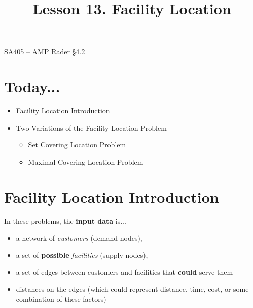 \documentclass[11pt]{article}
\makeatletter
\renewcommand{\labelitemi}{$\bullet$}
\theoremstyle{definition}
\renewcommand{\maketitle}{
  \noindent SA405 -- AMP \hfill Rader \S 4.2 \\

  \begin{center}\Large{\textbf{\@title}}\end{center}
}
\makeatother
\begin{document}
  
\title{Lesson 13.  Facility Location}

\maketitle

\section{Today...}

\renewcommand\labelitemi{--}
\begin{itemize}
	\item  Facility Location Introduction
	\item  Two Variations of the Facility Location Problem
	\begin{itemize}
	\item  Set Covering Location Problem
	\item  Maximal Covering Location Problem
	\end{itemize}
\end{itemize}

\section{Facility Location Introduction}
In these problems, the \textbf{input data} is...
\begin{itemize}
\item  a network of \emph{customers} (demand nodes),
\item  a set of \textbf{possible} \emph{facilities} (supply nodes),
\item  a set of edges between customers and facilities that \textbf{could} serve them
\item  distances on the edges (which could represent distance, time, cost, or some combination of these factors)
\end{itemize} 
\end{document}
